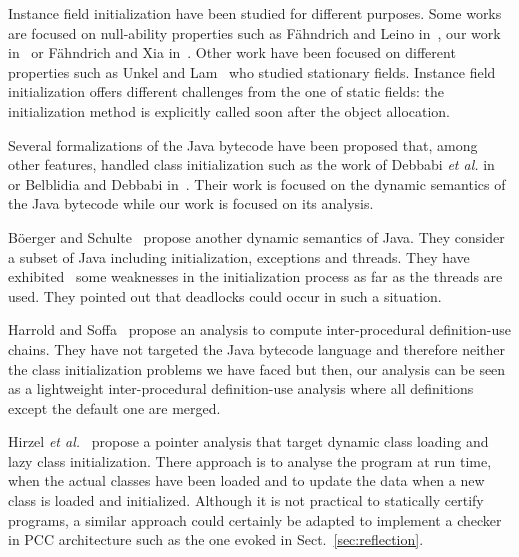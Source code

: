 \documentclass{entcs}
\begin{document}
{Instance field initialization have been studied for different
purposes.  Some works are focused on null-ability properties such as
Fähndrich and Leino in~\cite{fahndrich03:_declar_and_check_non_null},
our work in~\cite{hubert08-1:nonnull_annotations_inference} or
Fähndrich and Xia
in~\cite{fahndrich07:object_invariants_delayed_types}.  Other work
have been focused on different properties such as Unkel and
Lam~\cite{unkel08:infererence_stationary_fields} who studied
stationary fields.  Instance field initialization offers different
challenges from the one of static fields: the initialization method is
explicitly called soon after the object allocation.

Several formalizations of the Java bytecode have been proposed that,
among other features, handled class initialization such as the work of
Debbabi \emph{et al.} in~\cite{FormalJVM} or Belblidia and Debbabi
in~\cite{FormalJVM2}.  Their work is focused on the dynamic semantics
of the Java bytecode while our work is focused on its analysis.

Böerger and Schulte~\cite{Borger98aprogrammer} propose another dynamic
semantics of Java.  They consider a subset of Java including
initialization, exceptions and threads.  They have
exhibited~\cite{borger00initialization} some weaknesses in the
initialization process as far as the threads are used.  They pointed
out that deadlocks could occur in such a situation.

Harrold and Soffa~\cite{harrold94:interprocedural_def_use} propose an
analysis to compute inter-procedural definition-use chains.  They have
not targeted the Java bytecode language and therefore neither the
class initialization problems we have faced but then, our analysis can
be seen as a lightweight inter-procedural definition-use analysis
where all definitions except the default one are merged.

Hirzel \emph{et
  al.}~\cite{hirzel04:pointer_analysis_dynamic_class_loading} propose
a pointer analysis that target dynamic class loading and lazy class
initialization.  There approach is to analyse the program at run time,
when the actual classes have been loaded and to update the data when a
new class is loaded and initialized.  Although it is not practical to
statically certify programs, a similar approach could certainly be
adapted to implement a checker in PCC architecture such as the one
evoked in Sect.~\ref{sec:reflection}.


}
\end{document}
